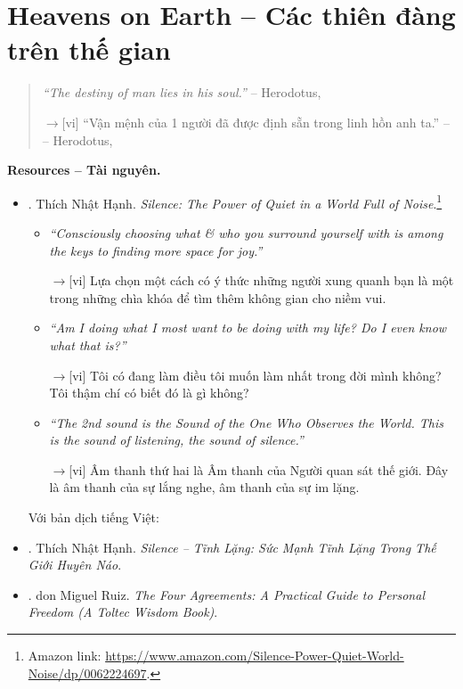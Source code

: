 \documentclass[12pt,twoside]{book}
\begin{document}
\section{Heavens on Earth -- Các thiên đàng trên thế gian}
\begin{quote}
	{\it``The destiny of man lies in his soul.''} -- {\sc Herodotus}, \cite[p. 1]{Adler_human_nature}
	
	{\sf[en]$\to$[vi]} ``Vận mệnh của 1 người đã được định sẵn trong linh hồn anh ta.'' -- -- {\sc Herodotus}, \cite[p. 4]{Adler_human_nature_VN}
\end{quote}
{\bf \textsf{Resources -- Tài nguyên.}}
\begin{itemize}
	\item \cite{Hanh_silence}. {\sc Thích Nhật Hạnh}. {\it Silence: The Power of Quiet in a World Full of Noise}.\footnote{Amazon link: \url{https://www.amazon.com/Silence-Power-Quiet-World-Noise/dp/0062224697}.}	
	\begin{itemize}
		\item {\it``Consciously choosing what \& who you surround yourself with is among the keys to finding more space for joy.''}
		
		{\sf[en]$\to$[vi]} Lựa chọn một cách có ý thức những người xung quanh bạn là một trong những chìa khóa để tìm thêm không gian cho niềm vui.
		
		\item {\it``Am I doing what I most want to be doing with my life? Do I even know what that is?''}
		
		{\sf[en]$\to$[vi]} Tôi có đang làm điều tôi muốn làm nhất trong đời mình không? Tôi thậm chí có biết đó là gì không?
		
		\item {\it``The 2nd sound is the Sound of the One Who Observes the World. This is the sound of listening, the sound of silence.''}
		
		{\sf[en]$\to$[vi]} Âm thanh thứ hai là Âm thanh của Người quan sát thế giới. Đây là âm thanh của sự lắng nghe, âm thanh của sự im lặng.
	\end{itemize}
	Với bản dịch tiếng Việt:
	\item \cite{Hanh_silence_VN}. {\sc Thích Nhật Hạnh}. {\it Silence -- Tĩnh Lặng: Sức Mạnh Tĩnh Lặng Trong Thế Giới Huyên Náo}.
	\item \cite{Ruiz_4_agreements}. {\sc don Miguel Ruiz}. {\it The Four Agreements: A Practical Guide to Personal Freedom (A Toltec Wisdom Book)}.
	

\end{itemize}
\end{document}
